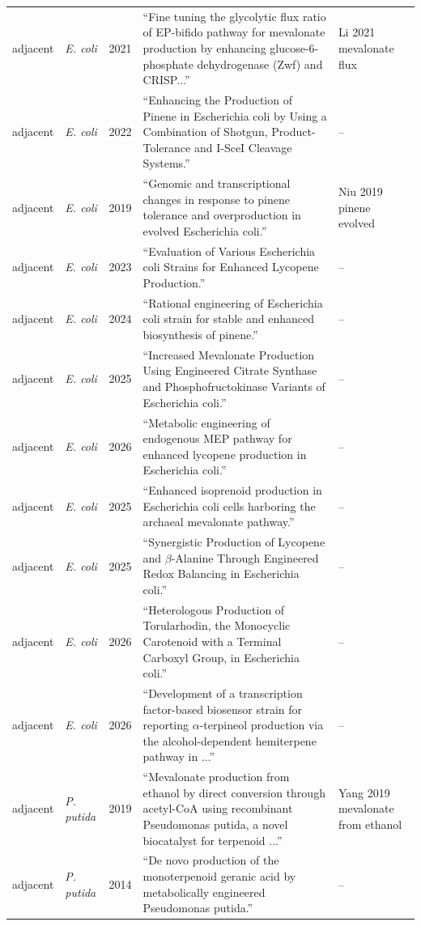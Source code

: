 \begin{landscape}
\begin{longtable}{@{}L{12mm} L{13mm} r L{104mm} L{38mm}@{}}
adjacent & \emph{E. coli} & 2021 & ``Fine tuning the glycolytic flux ratio of EP-bifido pathway for mevalonate production by enhancing glucose-6-phosphate dehydrogenase (Zwf) and CRISP...'' & Li 2021 mevalonate flux \\
adjacent & \emph{E. coli} & 2022 & ``Enhancing the Production of Pinene in Escherichia coli by Using a Combination of Shotgun, Product-Tolerance and I-SceI Cleavage Systems.'' & -- \\
adjacent & \emph{E. coli} & 2019 & ``Genomic and transcriptional changes in response to pinene tolerance and overproduction in evolved Escherichia coli.'' & Niu 2019 pinene evolved \\
adjacent & \emph{E. coli} & 2023 & ``Evaluation of Various Escherichia coli Strains for Enhanced Lycopene Production.'' & -- \\
adjacent & \emph{E. coli} & 2024 & ``Rational engineering of Escherichia coli strain for stable and enhanced biosynthesis of pinene.'' & -- \\
adjacent & \emph{E. coli} & 2025 & ``Increased Mevalonate Production Using Engineered Citrate Synthase and Phosphofructokinase Variants of Escherichia coli.'' & -- \\
adjacent & \emph{E. coli} & 2026 & ``Metabolic engineering of endogenous MEP pathway for enhanced lycopene production in Escherichia coli.'' & -- \\
adjacent & \emph{E. coli} & 2025 & ``Enhanced isoprenoid production in Escherichia coli cells harboring the archaeal mevalonate pathway.'' & -- \\
adjacent & \emph{E. coli} & 2025 & ``Synergistic Production of Lycopene and $\beta$-Alanine Through Engineered Redox Balancing in Escherichia coli.'' & -- \\
adjacent & \emph{E. coli} & 2026 & ``Heterologous Production of Torularhodin, the Monocyclic Carotenoid with a Terminal Carboxyl Group, in Escherichia coli.'' & -- \\
adjacent & \emph{E. coli} & 2026 & ``Development of a transcription factor-based biosensor strain for reporting $\alpha$-terpineol production via the alcohol-dependent hemiterpene pathway in ...'' & -- \\
adjacent & \emph{P. putida} & 2019 & ``Mevalonate production from ethanol by direct conversion through acetyl-CoA using recombinant Pseudomonas putida, a novel biocatalyst for terpenoid ...'' & Yang 2019 mevalonate from ethanol \\
adjacent & \emph{P. putida} & 2014 & ``De novo production of the monoterpenoid geranic acid by metabolically engineered Pseudomonas putida.'' & -- \\

\end{longtable}
\end{landscape}
